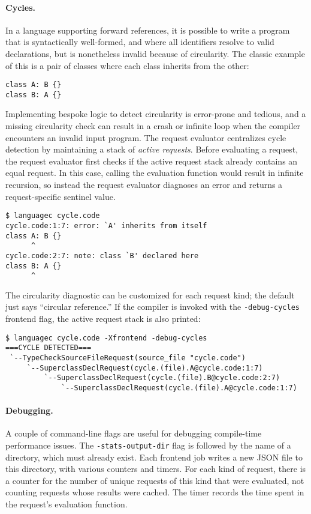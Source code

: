 \documentclass[../generics]{subfiles}
\begin{document}
\paragraph{Cycles.} In a language supporting forward references, it is possible to write a program that is syntactically well-formed, and where all identifiers resolve to valid declarations, but is nonetheless invalid because of circularity. The classic example of this is a pair of classes where each class inherits from the other:
\begin{Verbatim}
class A: B {}
class B: A {}
\end{Verbatim}
Implementing bespoke logic to detect circularity is error-prone and tedious, and a missing circularity check can result in a crash or infinite loop when the compiler encounters an invalid input program. The request evaluator centralizes cycle detection by maintaining a stack of \emph{active requests}. Before evaluating a request, the request evaluator first checks if the active request stack already contains an equal request. In this case, calling the evaluation function would result in infinite recursion, so instead the request evaluator diagnoses an error and returns a request-specific sentinel value.
\begin{Verbatim}
$ languagec cycle.code
cycle.code:1:7: error: `A' inherits from itself
class A: B {}
      ^
cycle.code:2:7: note: class `B' declared here
class B: A {}
      ^
\end{Verbatim}

The circularity diagnostic can be customized for each request kind; the default just says ``circular reference.'' If the compiler is invoked with the \texttt{-debug-cycles} frontend flag, the active request stack is also printed:
\begin{Verbatim}
$ languagec cycle.code -Xfrontend -debug-cycles
===CYCLE DETECTED===
 `--TypeCheckSourceFileRequest(source_file "cycle.code")
     `--SuperclassDeclRequest(cycle.(file).A@cycle.code:1:7)
         `--SuperclassDeclRequest(cycle.(file).B@cycle.code:2:7)
             `--SuperclassDeclRequest(cycle.(file).A@cycle.code:1:7)
\end{Verbatim}

\paragraph{Debugging.} A couple of command-line flags are useful for debugging compile-time performance issues. The \texttt{-stats-output-dir} flag is followed by the name of a directory, which must already exist. Each frontend job writes a new JSON file to this directory, with various counters and timers. For each kind of request, there is a counter for the number of unique requests of this kind that were evaluated, not counting requests whose results were cached. The timer records the time spent in the request's evaluation function.
\end{document}
